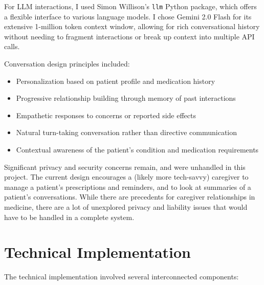 \documentclass[sigconf]{acmart}
\begin{document}
For LLM interactions, I used Simon Willison's \texttt{llm} Python package, which offers a flexible interface to various language models. I chose Gemini 2.0 Flash for its extensive 1-million token context window, allowing for rich conversational history without needing to fragment interactions or break up context into multiple API calls.

Conversation design principles included:

\begin{itemize}
  \item Personalization based on patient profile and medication history
  \item Progressive relationship building through memory of past interactions
  \item Empathetic responses to concerns or reported side effects
  \item Natural turn-taking conversation rather than directive communication
  \item Contextual awareness of the patient's condition and medication requirements
\end{itemize}

Significant privacy and security concerns remain, and were unhandled in this project. The current design encourages a (likely more tech-savvy) caregiver to manage a patient's prescriptions and reminders, and to look at summaries of a patient's conversations. While there are precedents for caregiver relationships in medicine, there are a lot of unexplored privacy and liability issues that would have to be handled in a complete system.

\section{Technical Implementation}
The technical implementation involved several interconnected components:
\end{document}
